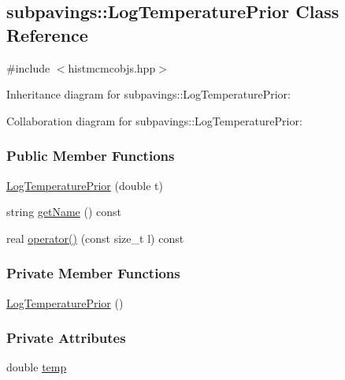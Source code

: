 \hypertarget{classsubpavings_1_1LogTemperaturePrior}{\subsection{subpavings\-:\-:\-Log\-Temperature\-Prior \-Class \-Reference}
\label{classsubpavings_1_1LogTemperaturePrior}
}


{\ttfamily \#include $<$histmcmcobjs.\-hpp$>$}



\-Inheritance diagram for subpavings\-:\-:\-Log\-Temperature\-Prior\-:


\-Collaboration diagram for subpavings\-:\-:\-Log\-Temperature\-Prior\-:
\subsubsection*{\-Public \-Member \-Functions}
\begin{DoxyCompactItemize}
\item 
\hyperlink{classsubpavings_1_1LogTemperaturePrior_a608c83384be76200c1ac7bf9905d95c2}{\-Log\-Temperature\-Prior} (double t)
\item 
string \hyperlink{classsubpavings_1_1LogTemperaturePrior_a8a41da03f7f93a125f796a8f8009996a}{get\-Name} () const 
\item 
real \hyperlink{classsubpavings_1_1LogTemperaturePrior_a09b2afaea3be6e703e24ecce36ef0b9a}{operator()} (const size\-\_\-t l) const 
\end{DoxyCompactItemize}
\subsubsection*{\-Private \-Member \-Functions}
\begin{DoxyCompactItemize}
\item 
\hyperlink{classsubpavings_1_1LogTemperaturePrior_affb626295cf29d795210eab0111bda13}{\-Log\-Temperature\-Prior} ()
\end{DoxyCompactItemize}
\subsubsection*{\-Private \-Attributes}
\begin{DoxyCompactItemize}
\item 
double \hyperlink{classsubpavings_1_1LogTemperaturePrior_a161fe5fa916de9250535f5b9f86811b6}{temp}
\end{DoxyCompactItemize}


